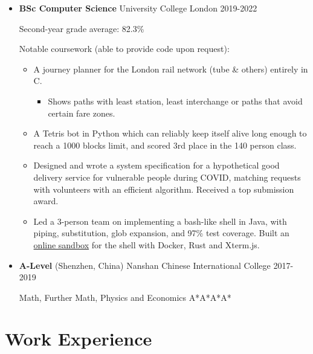   \begin{itemize}
    \item \textbf{BSc Computer Science} \dashdiv{} University College London \dashdiv{} 2019-2022

      Second-year grade average: 82.3\%

      Notable coursework (able to provide code upon request):

      \begin{itemize}
        \item A journey planner for the\tflicon{} London rail network (tube \& others) entirely in C.

        \begin{itemize}
          \item Shows paths with least station, least interchange or paths that avoid certain fare zones.
        \end{itemize}

        \item A Tetris bot in Python which can reliably keep itself alive long enough to reach a 1000 blocks limit, and scored 3rd place in the 140 person class.

        \item Designed and wrote a system specification for a hypothetical good delivery service for vulnerable people during COVID, matching requests with volunteers with an efficient algorithm. Received a top submission award.

        \item Led a 3-person team on implementing a bash-like shell in Java, with piping, substitution, glob expansion, and 97\% test coverage. Built an \href{https://jsh-sandbox.maowtm.org}{\color{link}online sandbox} for the shell with Docker, Rust and Xterm.js.
      \end{itemize}

    \item \textbf{A-Level} \dashdiv{} (Shenzhen, China) Nanshan Chinese International College \dashdiv{} 2017-2019

      Math, Further Math, Physics and Economics \dashdiv{} A*A*A*A*
  \end{itemize}

  \section{Work Experience}

